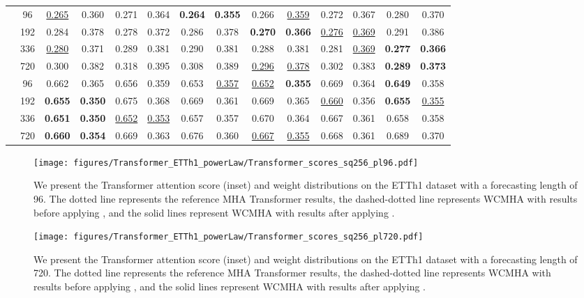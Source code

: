 \begin{table*}[!ht]
{\begin{tabular}{c|c|cc|cc|cc|cc|cc|cc}
		& 96 &  \underline{0.265} & 0.360 &  0.271 & 0.364 &  \textbf{0.264} & \textbf{0.355} &  0.266 & \underline{0.359} &  0.272 & 0.367 &  0.280 & 0.370  \\
		& 192 &  0.284 & 0.378 &  0.278 & 0.372 &  0.286 & 0.378 &  \textbf{0.270} & \textbf{0.366} &  \underline{0.276} & \underline{0.369} &  0.291 & 0.386  \\
		& 336 &  \underline{0.280} & 0.371 &  0.289 & 0.381 &  0.290 & 0.381 &  0.288 & 0.381 &  0.281 & \underline{0.369} &  \textbf{0.277} & \textbf{0.366}  \\
		& 720 &  0.300 & 0.382 &  0.318 & 0.395 &  0.308 & 0.389 &  \underline{0.296} & \underline{0.378} &  0.302 & 0.383 &  \textbf{0.289} & \textbf{0.373}  \\
	\midrule
	\multirow{4}{*}{\rotatebox[origin=c]{90}{\text{Traffic}}}
		& 96 &  0.662 & 0.365 &  0.656 & 0.359 &  0.653 & \underline{0.357} &  \underline{0.652} & \textbf{0.355} &  0.669 & 0.364 &  \textbf{0.649} & 0.358  \\
		& 192 &  \textbf{0.655} & \textbf{0.350} &  0.675 & 0.368 &  0.669 & 0.361 &  0.669 & 0.365 &  \underline{0.660} & 0.356 &  \textbf{0.655} & \underline{0.355}  \\
		& 336 &  \textbf{0.651} & \textbf{0.350} &  \underline{0.652} & \underline{0.353} &  0.657 & 0.357 &  0.670 & 0.364 &  0.667 & 0.361 &  0.658 & 0.358  \\
		& 720 &  \textbf{0.660} & \textbf{0.354} &  0.669 & 0.363 &  0.676 & 0.360 &  \underline{0.667} & \underline{0.355} &  0.668 & 0.361 &  0.689 & 0.370  \\
	\bottomrule
	\end{tabular}}
\end{table*}

\begin{figure*}[!ht]
    \centering
    \texttt{[image: figures/Transformer\_ETTh1\_powerLaw/Transformer\_scores\_sq256\_pl96.pdf]}
    \caption{We present the Transformer attention score (inset) and weight distributions on the ETTh1 dataset with a forecasting length of 96. The dotted line represents the reference MHA Transformer results, the dashed-dotted line represents WCMHA with \fpl{} results before applying \maskCL, and the solid lines represent WCMHA with \fpl{} results after applying \maskCL.}
        \label{fig:transformer_etth1_96_attn_full}

\end{figure*}

\begin{figure*}[!ht]
    \centering
    \texttt{[image: figures/Transformer\_ETTh1\_powerLaw/Transformer\_scores\_sq256\_pl720.pdf]}
    \caption{We present the Transformer attention score (inset) and weight distributions on the ETTh1 dataset with a forecasting length of 720. The dotted line represents the reference MHA Transformer results, the dashed-dotted line represents WCMHA with \fpl{} results before applying \maskCL, and the solid lines represent WCMHA with \fpl{} results after applying \maskCL.}
    \label{fig:transformer_etth1_720_attn_full}
\end{figure*}

